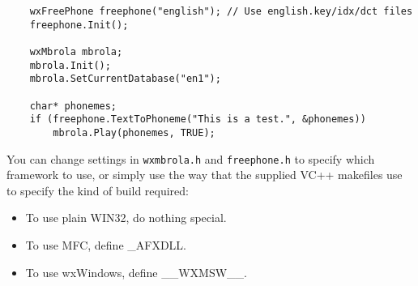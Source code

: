 {\small\begin{verbatim}
    wxFreePhone freephone("english"); // Use english.key/idx/dct files
	freephone.Init();

    wxMbrola mbrola;
    mbrola.Init();
    mbrola.SetCurrentDatabase("en1");

    char* phonemes;
    if (freephone.TextToPhoneme("This is a test.", &phonemes))
        mbrola.Play(phonemes, TRUE);
\end{verbatim}
}


You can change settings in {\tt wxmbrola.h} and {\tt freephone.h} to specify
which framework to use, or simply use the way that the supplied VC++ makefiles use
to specify the kind of build required:

\begin{itemize}\itemsep=0pt
\item To use plain WIN32, do nothing special.
\item To use MFC, define _AFXDLL.
\item To use wxWindows, define __WXMSW__.
\end{itemize}

